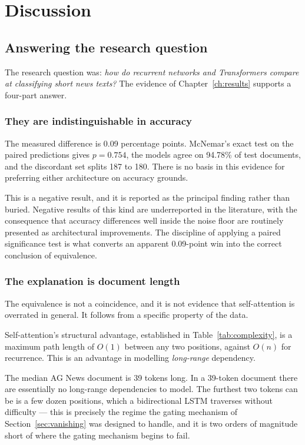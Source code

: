 \chapter{Discussion}
\label{ch:discussion}

\section{Answering the research question}

The research question was: \emph{how do recurrent networks and Transformers compare at classifying
short news texts?} The evidence of Chapter~\ref{ch:results} supports a four-part answer.

\subsection{They are indistinguishable in accuracy}

The measured difference is 0.09 percentage points. McNemar's exact test on the paired predictions
gives $p = 0.754$, the models agree on 94.78\% of test documents, and the discordant set splits 187
to 180. There is no basis in this evidence for preferring either architecture on accuracy grounds.

This is a negative result, and it is reported as the principal finding rather than buried. Negative
results of this kind are underreported in the literature, with the consequence that accuracy
differences well inside the noise floor are routinely presented as architectural improvements. The
discipline of applying a paired significance test is what converts an apparent 0.09-point win into
the correct conclusion of equivalence.

\subsection{The explanation is document length}

The equivalence is not a coincidence, and it is not evidence that self-attention is overrated in
general. It follows from a specific property of the data.

Self-attention's structural advantage, established in Table~\ref{tab:complexity}, is a maximum path
length of $O(1)$ between any two positions, against $O(n)$ for recurrence. This is an advantage in
modelling \emph{long-range} dependency.

The median AG News document is 39 tokens long. In a 39-token document there are essentially no
long-range dependencies to model. The furthest two tokens can be is a few dozen positions, which a
bidirectional LSTM traverses without difficulty --- this is precisely the regime the gating
mechanism of Section~\ref{sec:vanishing} was designed to handle, and it is two orders of magnitude
short of where the gating mechanism begins to fail.

